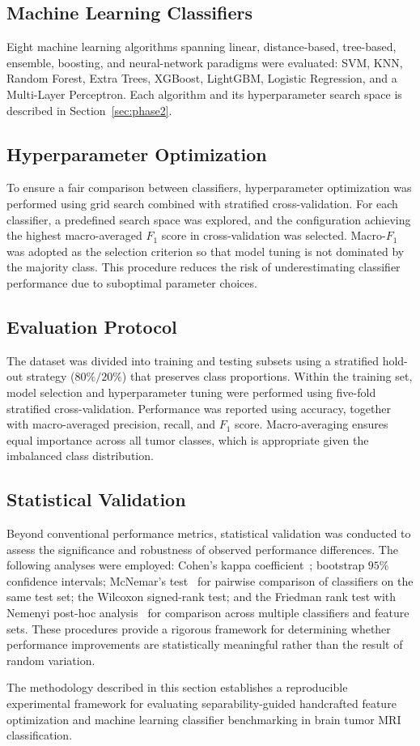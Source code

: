 \subsection{Machine Learning Classifiers}
\label{sec:classifiers_setup}

Eight machine learning algorithms spanning linear, distance-based, tree-based,
ensemble, boosting, and neural-network paradigms were evaluated: SVM, KNN,
Random Forest, Extra Trees, XGBoost, LightGBM, Logistic Regression, and a
Multi-Layer Perceptron. Each algorithm and its hyperparameter search space is
described in Section~\ref{sec:phase2}.

\subsection{Hyperparameter Optimization}
\label{sec:hyperparams_setup}

To ensure a fair comparison between classifiers, hyperparameter optimization was
performed using grid search combined with stratified cross-validation. For each
classifier, a predefined search space was explored, and the configuration
achieving the highest macro-averaged $F_1$ score in cross-validation was
selected. Macro-$F_1$ was adopted as the selection criterion so that model
tuning is not dominated by the majority class. This procedure reduces the risk
of underestimating classifier performance due to suboptimal parameter choices.

\subsection{Evaluation Protocol}
\label{sec:protocol}

The dataset was divided into training and testing subsets using a stratified
hold-out strategy ($80\%/20\%$) that preserves class proportions. Within the
training set, model selection and hyperparameter tuning were performed using
five-fold stratified cross-validation. Performance was reported using accuracy,
together with macro-averaged precision, recall, and $F_1$ score. Macro-averaging
ensures equal importance across all tumor classes, which is appropriate given
the imbalanced class distribution.

\subsection{Statistical Validation}
\label{sec:stats_setup}

Beyond conventional performance metrics, statistical validation was conducted to
assess the significance and robustness of observed performance differences. The
following analyses were employed: Cohen's kappa coefficient~\cite{cohen1960};
bootstrap $95\%$ confidence intervals; McNemar's test~\cite{mcnemar1947} for
pairwise comparison of classifiers on the same test set; the Wilcoxon
signed-rank test; and the Friedman rank test with Nemenyi post-hoc
analysis~\cite{demsar2006} for comparison across multiple
classifiers and feature sets. These procedures provide a rigorous framework for
determining whether performance improvements are statistically meaningful rather
than the result of random variation.

The methodology described in this section establishes a reproducible
experimental framework for evaluating separability-guided handcrafted feature
optimization and machine learning classifier benchmarking in brain tumor MRI
classification.
